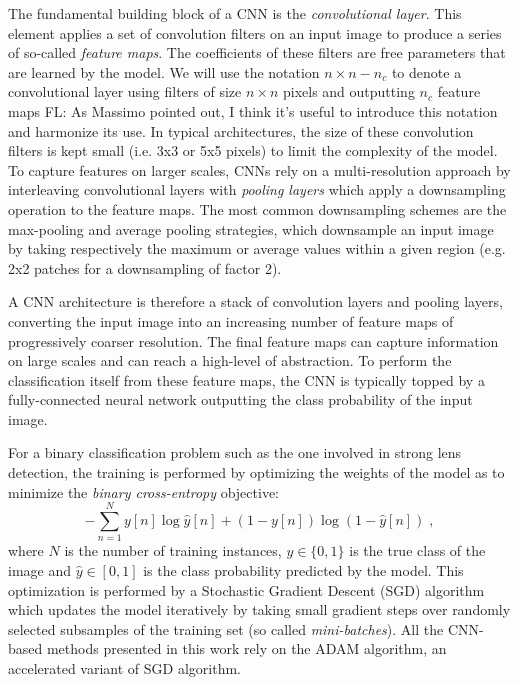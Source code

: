 \documentclass[useAMS,usenatbib]{mnras}
\newcommand{\fl}[1]{{\color{magenta}FL: #1}}
\begin{document}
The fundamental building block of a CNN is the \textit{convolutional layer}. This element applies a set of convolution filters on an input image to produce a series of so-called \textit{feature maps}. The coefficients of these filters are free parameters that are learned by the model. We will use the notation 
$n \times n - n_c$ to denote a convolutional layer using filters of size $n \times n$ pixels and outputting $n_c$ feature maps \fl{As Massimo pointed out, I think it's useful to introduce this notation and harmonize its use}. In typical architectures, the size of these convolution filters is kept small (i.e. 3x3 or 5x5 pixels) to limit the complexity of the model. To capture features on larger scales, CNNs rely on a multi-resolution approach by interleaving convolutional layers with \textit{pooling layers} which apply a downsampling operation to the feature maps. The most common downsampling schemes are the max-pooling and average pooling strategies, which downsample an input image by taking respectively the maximum or average values within a given region (e.g. 2x2 patches for a downsampling of factor 2).

A CNN architecture is therefore a stack of convolution layers and pooling layers, converting the input image into an increasing number of feature maps of progressively coarser resolution. The final feature maps can capture information on large scales and can reach a high-level of abstraction. To perform the classification itself from these feature maps, the CNN is typically topped by a fully-connected neural network outputting the class probability of the input image.

For a binary classification problem such as the one involved in strong lens detection, the training is performed by optimizing the weights of the model as to minimize the \textit{binary cross-entropy} objective:
\begin{equation}
	- \sum_{n=1}^{N} y[n] \log \hat{y}[n] + (1 - y[n])\log(1 - \hat{y}[n]) \;,
\end{equation}
where $N$ is the number of training instances, $y \in \{0,1\}$ is the true class of the image and $\hat{y} \in [0,1]$ is the class probability predicted by the model. This optimization is performed by a Stochastic Gradient Descent (SGD) algorithm which updates the model iteratively by taking small gradient steps over randomly selected subsamples of the training set (so called \textit{mini-batches}). All the CNN-based methods presented in this work rely on the ADAM \citep{Kingma_2014} algorithm, an accelerated variant of SGD algorithm.
\end{document}
